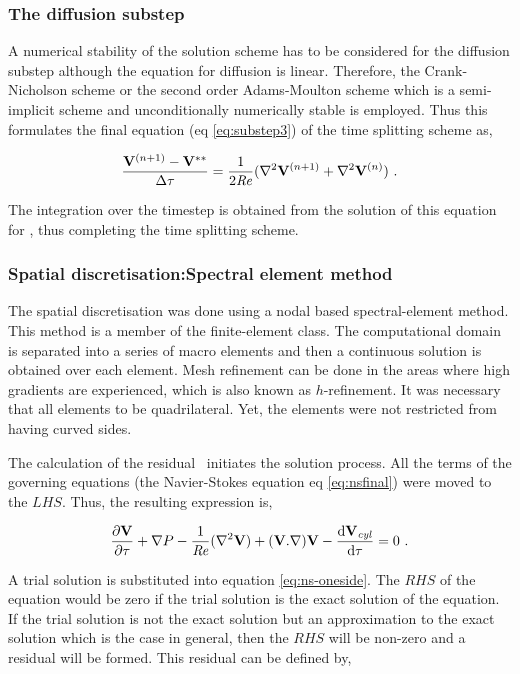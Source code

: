 \subsubsection{The diffusion substep}

A numerical stability of the solution scheme has to be considered for the diffusion substep although the equation for diffusion is linear. Therefore, the Crank-Nicholson scheme or the second order Adams-Moulton scheme which is a semi-implicit scheme and unconditionally numerically stable is employed. Thus this formulates the final equation (eq \ref{eq:substep3}) of the time splitting scheme as,

\begin{equation} \centering
\label{eq:diff_num}
\frac{\Vnext - \Vintint}{\Delta\tau} = \frac{1}{2\Rey}(\gradsq{\Vnext} + \gradsq{\vecV^{(n)}}) ~.
\end{equation}

The integration over the timestep is obtained from the solution of this equation  for \Vnext, thus completing the time splitting scheme. 


\subsubsection{Spatial discretisation:Spectral element method}
 
 The spatial discretisation was done using a nodal based spectral-element method. This method is a member of the finite-element class. The computational domain is separated into a series of macro elements and then a continuous solution is obtained over each element. Mesh refinement can be done in the areas where high gradients are experienced, which is also known as $h$-refinement. It was necessary that all elements to be quadrilateral. Yet, the elements were not restricted from having curved sides.
 
 The calculation of the residual \residual\ initiates the solution process. All the terms of the governing equations (the Navier-Stokes equation eq \ref{eq:nsfinal}) were moved to the $LHS$. Thus, the resulting expression is, 
 
 \begin{equation} \centering
 \label{eq:ns-oneside}
 \pderiv{\vecV}{\tau} + \grad{\Pres} - \frac{1}{\Rey}(\gradsq{\vecV}) + (\vecV.\nabla)\vecV - \accframe = 0 ~.
 \end{equation}
 
 A trial solution is substituted into equation \ref{eq:ns-oneside}. The $RHS$ of the equation would be zero if the trial solution is the exact solution of the equation. If the trial solution is not the exact solution but an approximation to the exact solution which is the case in general, then the $RHS$ will be non-zero and a residual will be formed. This residual can be defined by, 
 
